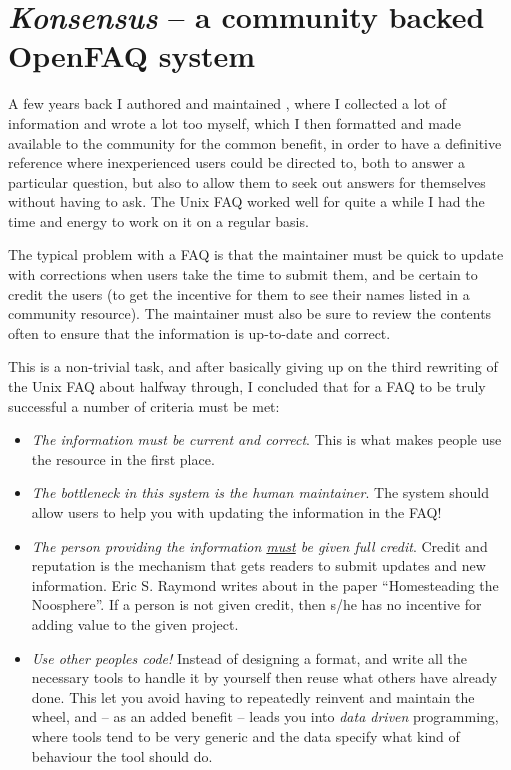 
\chapter{\textit{Konsensus} -- a
community backed OpenFAQ system}
\label{cha:konsensus}

A few years back I authored and maintained
,
where I collected a lot of information and wrote a lot too myself,
which I then formatted and made available to the community for the
common benefit, in order to have a definitive reference where
inexperienced users could be directed to, both to answer a particular
question, but also to allow them to seek out answers for themselves
without having to ask.  The Unix FAQ worked well for quite a while
I had the time and energy to work on it on a regular basis.

The typical problem with a FAQ is that the maintainer must be quick to
update with corrections when users take the time to submit them, and
be certain to credit the users (to get the incentive for them to see
their names listed in a community resource).  The maintainer must also
be sure to review the contents often to ensure that the information is
up-to-date and correct.

This is a non-trivial task, and after basically giving up on the third
rewriting of the Unix FAQ about halfway through, I concluded that for
a FAQ to be truly successful a number of criteria must be met:

\begin{itemize}

\item \emph{The information must be current and correct}.  This is
  what makes people use the resource in the first place.
  
\item 
  \emph{The bottleneck in this system is the human maintainer}.  The system
  should allow users to help you with updating the information in the
  FAQ!

  
\item \emph{The person providing the information \underline{must} be
    given full credit}.  Credit and reputation is the mechanism that
  gets readers to submit updates and new information.  Eric S. Raymond
  writes about
   in the paper
  ``Homesteading the Noosphere''.  If a person is not given credit,
  then s/he has no incentive for adding value to the given project.

\item \textit{Use other peoples code!}  Instead of designing a format,
and write all the necessary tools to handle it by yourself then reuse
what others have already done.  This let you avoid having to
repeatedly reinvent and maintain the wheel, and -- as an added benefit
-- leads you into \textit{data driven} programming, where tools tend
to be very generic and the data specify what kind of behaviour the
tool should do.
  
\end{itemize}

